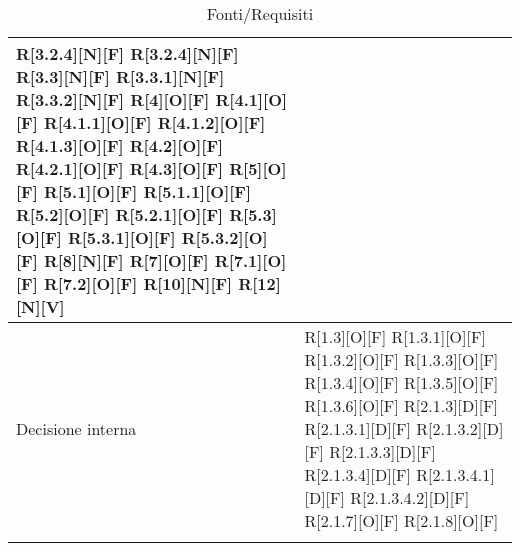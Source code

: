 \begin{longtable}{X | X}
		R[3.2.4][N][F]         \newline
		R[3.2.4][N][F]         \newline
		R[3.3][N][F]           \newline
		R[3.3.1][N][F]         \newline
		R[3.3.2][N][F]         \newline
		R[4][O][F]             \newline
		R[4.1][O][F]	         \newline
		R[4.1.1][O][F]         \newline
		R[4.1.2][O][F]         \newline
		R[4.1.3][O][F]         \newline
		R[4.2][O][F]           \newline
		R[4.2.1][O][F]         \newline
		R[4.3][O][F]           \newline
		R[5][O][F]             \newline
		R[5.1][O][F]	         \newline
		R[5.1.1][O][F]         \newline
		R[5.2][O][F]           \newline
		R[5.2.1][O][F]         \newline
		R[5.3][O][F]           \newline
		R[5.3.1][O][F]         \newline
		R[5.3.2][O][F]         \newline
		R[8][N][F] \newline
		R[7][O][F] \newline
		R[7.1][O][F] \newline
		R[7.2][O][F] \newline
		R[10][N][F] \newline
		R[12][N][V] \newline \\
		\hline
		Decisione interna & 
		R[1.3][O][F]        \newline
		R[1.3.1][O][F]      \newline  
		R[1.3.2][O][F]      \newline  
		R[1.3.3][O][F]      \newline  
		R[1.3.4][O][F]      \newline  
		R[1.3.5][O][F]      \newline  
		R[1.3.6][O][F]      \newline  
		R[2.1.3][D][F]      \newline  
		R[2.1.3.1][D][F]    \newline    
		R[2.1.3.2][D][F]    \newline    
		R[2.1.3.3][D][F]    \newline    
		R[2.1.3.4][D][F]    \newline    
		R[2.1.3.4.1][D][F]	\newline        
		R[2.1.3.4.2][D][F]  \newline      
		R[2.1.7][O][F]      \newline  
		R[2.1.8][O][F]      \newline  \\
\bottomrule
\caption{Fonti/Requisiti}
\end{longtable}   